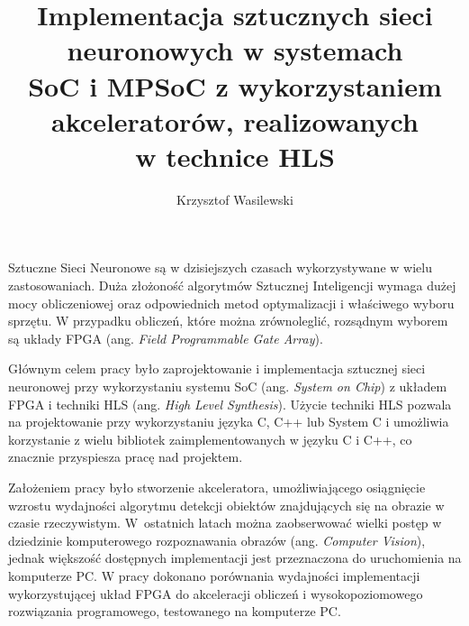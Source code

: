 \documentclass[
    left=2.5cm,         %
    right=2.5cm,        %
    top=2.5cm,          %
    bottom=3cm,         %
    bindingoffset=6mm,  %
    nohyphenation=false %
]{eiti/eiti-thesis}
\begin{document}
\MasterThesis %
{}
\title{
    Implementacja sztucznych sieci neuronowych w systemach\\
    SoC i MPSoC z wykorzystaniem akceleratorów, realizowanych\\w technice HLS
}
\author{Krzysztof Wasilewski}
\date{\the\year}
\maketitle

\cleardoublepage %

\streszczenie
Sztuczne Sieci Neuronowe są w dzisiejszych czasach wykorzystywane w wielu 
zastosowaniach. Duża złożoność algorytmów Sztucznej Inteligencji wymaga 
dużej mocy obliczeniowej oraz odpowiednich metod optymalizacji 
i właściwego wyboru sprzętu. W przypadku obliczeń, które można 
zrównoleglić, rozsądnym wyborem są układy FPGA (ang. \emph{Field Programmable Gate 
Array}). 

Głównym celem pracy było zaprojektowanie i implementacja sztucznej sieci
neuronowej przy wykorzystaniu systemu SoC (ang. \emph{System on Chip}) z układem 
FPGA i techniki HLS (ang. \emph{High Level Synthesis}). Użycie techniki HLS
pozwala na projektowanie przy wykorzystaniu języka C, C++ lub System 
C i umożliwia korzystanie z wielu bibliotek zaimplementowanych w języku 
C i C++, co znacznie przyspiesza pracę nad projektem.

Założeniem pracy było stworzenie akceleratora, umożliwiającego osiągnięcie
wzrostu wydajności algorytmu detekcji obiektów znajdujących się na 
obrazie w czasie rzeczywistym. W~ostatnich latach można zaobserwować 
wielki postęp w dziedzinie komputerowego rozpoznawania obrazów 
(ang. \emph{Computer Vision}), jednak większość dostępnych implementacji jest 
przeznaczona do uruchomienia na komputerze PC. W pracy dokonano porównania 
wydajności implementacji wykorzystującej układ FPGA do akceleracji obliczeń
i wysokopoziomowego rozwiązania programowego, testowanego na komputerze PC.
\end{document}
